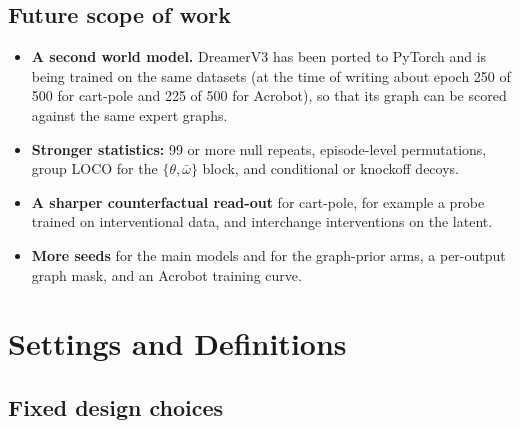 \documentclass[11pt, a4paper, oneside,enumerate,textcomp]{report}
\newcommand{\wb}{\bar{\omega}}
\begin{document}
\section{Future scope of work}

\begin{itemize}
	\item \textbf{A second world model.} DreamerV3 has been ported to PyTorch and is being trained on the same datasets (at the time of writing about epoch 250 of 500 for cart-pole and 225 of 500 for Acrobot), so that its graph can be scored against the same expert graphs.
	\item \textbf{Stronger statistics:} 99 or more null repeats, episode-level permutations, group LOCO for the $\{\theta, \wb\}$ block, and conditional or knockoff decoys.
	\item \textbf{A sharper counterfactual read-out} for cart-pole, for example a probe trained on interventional data, and interchange interventions on the latent.
	\item \textbf{More seeds} for the main models and for the graph-prior arms, a per-output graph mask, and an Acrobot training curve.
\end{itemize}


\newpage
{}
\appendix
\chapter{Settings and Definitions}
\thispagestyle{empty}

\section{Fixed design choices}
\end{document}

